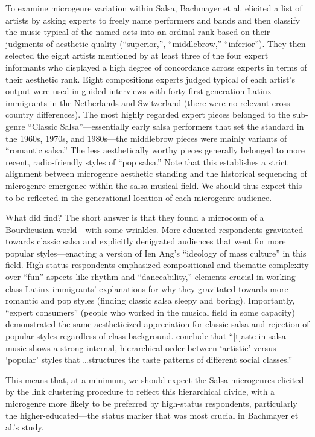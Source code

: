 \documentclass[a4paper,12pt]{extarticle}
\begin{document}
To examine microgenre variation within Salsa, Bachmayer et al. elicited a list of artists by asking experts to freely name performers and bands and then classify the music typical of the named acts into an ordinal rank based on their judgments of aesthetic quality (``superior,'', ``middlebrow,'' ``inferior''). They then selected the eight artists mentioned by at least three of the four expert informants who displayed a high degree of concordance across experts in terms of their aesthetic rank. Eight compositions experts judged typical of each artist's output were used in guided interviews with forty first-generation Latinx immigrants in the Netherlands and Switzerland (there were no relevant cross-country differences). The most highly regarded expert pieces belonged to the sub-genre ``Classic Salsa''---essentially early salsa performers that set the standard in the 1960s, 1970s, and 1980s---the middlebrow pieces were mainly variants of ``romantic salsa.'' The less aesthetically worthy pieces generally belonged to more recent, radio-friendly styles of ``pop salsa.'' Note that this establishes a strict alignment between microgenre aesthetic standing and the historical sequencing of microgenre emergence within the salsa musical field. We should thus expect this to be reflected in the generational location of each microgenre audience.

What did \citet{Bachmayer2014-pk} find? The short answer is that they found a microcosm of a Bourdieusian world---with some wrinkles. More educated respondents gravitated towards classic salsa and explicitly denigrated audiences that went for more popular styles---enacting a version of Ien Ang's \citeyearpar{ang2000dallas} ``ideology of mass culture'' in this field. High-status respondents emphasized compositional and thematic complexity over ``fun'' aspects like rhythm and ``danceability,'' elements crucial in working-class Latinx immigrants' explanations for why they gravitated towards more romantic and pop styles (finding classic salsa sleepy and boring). Importantly, ``expert consumers'' (people who worked in the musical field in some capacity) demonstrated the same aestheticized appreciation for classic salsa and rejection of popular styles regardless of class background. \citep[][62]{Bachmayer2014-pk} conclude that ``[t]aste in salsa music shows a strong internal, hierarchical order between `artistic' versus `popular' styles that \ldots structures the taste patterns of different social classes.'' 

This means that, at a minimum, we should expect the Salsa microgenres elicited by the link clustering procedure to reflect this hierarchical divide, with a microgenre more likely to be preferred by high-status respondents, particularly the higher-educated---the status marker that was most crucial in Bachmayer et al.'s study. 
\end{document}
